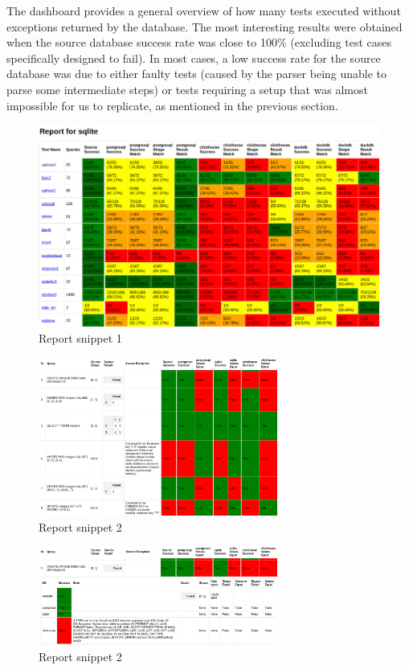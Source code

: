 \documentclass[acmsmall,nonacm]{acmart}
\begin{document}
The dashboard provides a general overview of how many tests executed without exceptions returned by the database. The most interesting results were obtained when the source database success rate was close to 100\% (excluding test cases specifically designed to fail). In most cases, a low success rate for the source database was due to either faulty tests (caused by the parser being unable to parse some intermediate steps) or tests requiring a setup that was almost impossible for us to replicate, as mentioned in the previous section.
\begin{figure}[h!]
    \centering
    \includegraphics[width=0.7\linewidth]{img/report_01.png}
    \caption{Report snippet 1}
    \label{fig:rep1}
\end{figure}
\begin{figure}[H]
    \centering
    \includegraphics[width=0.7\textwidth]{img/report_02.png}
    \caption{Report snippet 2}
    \label{fig:rep2}
\end{figure}
\begin{figure}[H]
    \centering
    \includegraphics[width=0.7\textwidth]{img/report_03.png}
    \caption{Report snippet 2}
    \label{fig:rep3}
    \vspace{-0.3cm}
\end{figure}
\end{document}
